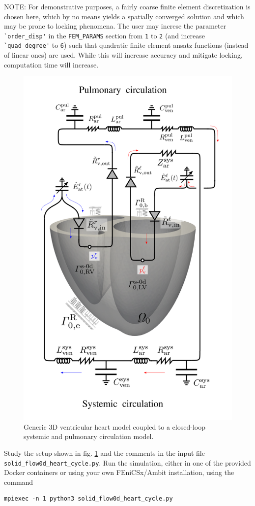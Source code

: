 \documentclass[a4paper,12pt]{report}
\begin{document}
NOTE: For demonstrative purposes, a fairly coarse finite element discretization is chosen here, which by no means yields a spatially converged solution and which
may be prone to locking phenomena. The user may increse the parameter \verb"`order_disp'" in the \verb"FEM_PARAMS" section from \verb"1" to \verb"2" (and increase \verb"`quad_degree'" to \verb"6") such that quadratic finite element ansatz functions (instead of linear ones) are used. While this will increase accuracy and mitigate locking, computation time will
increase.

\begin{figure}
\centering
\includegraphics[width=0.6\columnwidth]{fig/heart_syspul_setup}
\caption{Generic 3D ventricular heart model coupled to a closed-loop systemic and pulmonary circulation model.}
\label{fig:heart_syspul_setup}
\end{figure}

Study the setup shown in fig. \ref{fig:heart_syspul_setup} and the comments in the input file \verb"solid_flow0d_heart_cycle.py". Run the simulation, either in one of the provided Docker containers or using your own FEniCSx/Ambit installation, using the command
\begin{verbatim}
mpiexec -n 1 python3 solid_flow0d_heart_cycle.py
\end{verbatim}
\end{document}
